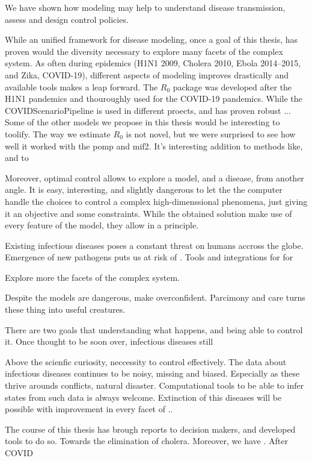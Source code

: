 We have shown how modeling may help to understand disease transmission, assess and design control policies. 

While an unified framework for disease modeling, once a goal of this thesis, has proven would the diversity necessary to explore many facets of the complex system. As often during epidemics (H1N1 2009, Cholera 2010, Ebola 2014--2015, and Zika, COVID-19), different aspects of modeling improves drastically and available tools makes a leap forward. The $R_0$ package was developed after the H1N1 pandemics\cite{Obadia:R0PackageToolbox:2012} and thouroughly used for the COVID-19 pandemics. While the COVIDScenarioPipeline is used in different proects, and has proven robust ... Some of the other models we propose in this thesis would be interesting to toolify. The way we estimate $R_0$ is not novel, but we were surprised to see how well it worked with the pomp and mif2. It's interesting addition to methods like, and to 

Moreover, optimal control allows to explore a model, and a disease, from another angle. It is easy, interesting, and slightly dangerous to let the the computer handle the choices to control a complex high-dimenssional  phenomena, just giving it an objective and some constraints. While the obtained solution make use of every feature of the model, they allow in a principle.


Existing infectious diseases poses a constant threat on humans accross the globe. Emergence of new pathogens puts us at risk of . Tools and integrations for for 

Explore more the facets of the complex system.

Despite the models are dangerous, make overconfident. Parcimony and care turns these thing into useful creatures.

There are two goals that understanding what happens, and being able to control it. Once thought to be soon over, infectious diseases still 


Above the scienfic curiosity, neccessity to control effectively. The data about infectious diseases continues to be noisy, missing and biased. Especially as these thrive arounds conflicts, natural disaster. Computational tools to be able to infer states from such data is always welcome. Extinction of this diseases will be possible with improvement in every facet of ..

The course of this thesis has brough reports to decision makers, and developed tools to do so. Towards the elimination of cholera. Moreover, we have . After COVID